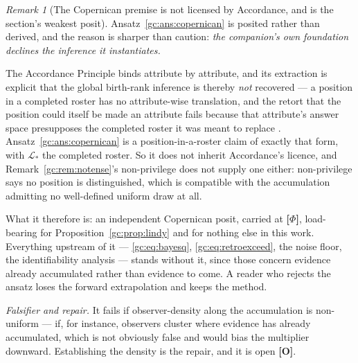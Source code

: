 \documentclass[11pt]{article}
\numberwithin{equation}{section}
\theoremstyle{plain}
\theoremstyle{definition}
\theoremstyle{remark}
\newtheorem{remark}[theorem]{Remark}
\newcommand{\Lc}{\mathcal{L}}
\begin{document}
\begin{remark}[The Copernican premise is not licensed by Accordance, and
is the section's weakest posit]\label{gc:rem:copernicancost}
Ansatz~\ref{gc:ans:copernican} is posited rather than derived, and the reason is sharper than caution: \emph{the companion's
own foundation declines the inference it instantiates.}

The Accordance Principle binds attribute by attribute, and its extraction
is explicit that the global birth-rank inference is thereby \emph{not}
recovered --- a position in a completed roster has no attribute-wise
translation, and the retort that the position could itself be made an
attribute fails because that attribute's answer space presupposes the
completed roster it was meant to replace \cite{NexicFoundation}.
Ansatz~\ref{gc:ans:copernican} is a position-in-a-roster claim of
exactly that form, with $\Lc_\ast$ the completed roster. So it does not
inherit Accordance's licence, and Remark~\ref{gc:rem:notense}'s non-privilege
does not supply one either: non-privilege says no position is
distinguished, which is compatible with the accumulation admitting no
well-defined uniform draw at all.

What it therefore is: an independent Copernican posit, carried at
\textbf{[$\Phi$]}, load-bearing for
Proposition~\ref{gc:prop:lindy} and for nothing else in this work.
Everything upstream of it --- \eqref{gc:eq:bayesq},
\eqref{gc:eq:retroexceed}, the noise floor, the identifiability
analysis --- stands without it, since those concern evidence already
accumulated rather than evidence to come. A reader who rejects the
ansatz loses the forward extrapolation and keeps the method.

\emph{Falsifier and repair.} It fails if observer-density along
the accumulation is non-uniform --- if, for instance, observers cluster
where evidence has already accumulated, which is not obviously false and
would bias the multiplier downward. Establishing the density is the
repair, and it is open \textbf{[O]}.
\end{remark}
\end{document}

